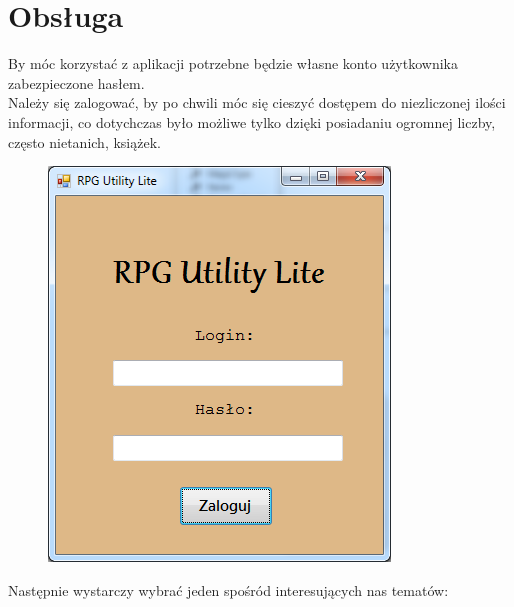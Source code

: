 \documentclass{article}
\begin{document}
\section{Obsługa}
By móc korzystać z aplikacji potrzebne będzie własne konto użytkownika zabezpieczone hasłem.
\\Należy się zalogować, by po chwili móc się cieszyć dostępem do niezliczonej ilości informacji, co dotychczas było możliwe tylko dzięki posiadaniu ogromnej liczby, często nietanich, książek.
\\
\begin{figure}[h!]
\begin{center}
    
\centering
\includegraphics[]{ekranpowitalny.png}

\end{center}
\end{figure}
\newpage
Następnie wystarczy wybrać jeden spośród interesujących nas tematów:
\end{document}
